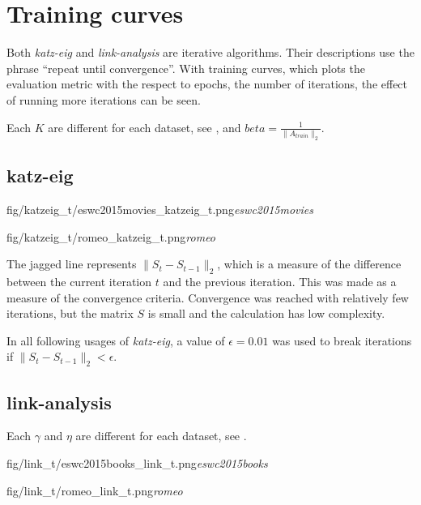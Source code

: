
\section{Training curves}\label{sec:graphs:training_curves}

Both \textit{katz-eig} and \textit{link-analysis} are iterative algorithms. Their descriptions use the phrase ``repeat until convergence''.  With training curves, which plots the evaluation metric with the respect to epochs, the number of iterations, the effect of running more iterations can be seen.

Each $K$ are different for each dataset, see , and $beta = \frac{1}{\|A_{train}\|_2}$.

\subsection{katz-eig}

\FloatBarrier

{fig/katzeig_t/eswc2015movies_katzeig_t.png}{\textit{eswc2015movies}}

{fig/katzeig_t/romeo_katzeig_t.png}{\textit{romeo}}

\FloatBarrier

The jagged line represents $\|S_t - S_{t - 1}\|_2$, which is a measure of the difference between the current iteration $t$ and the previous iteration. This was made as a measure of the convergence criteria. Convergence was reached with relatively few iterations, but the matrix $S$ is small and the calculation has low complexity.

In all following usages of \textit{katz-eig}, a value of $\epsilon = 0.01$ was used to break iterations if $\|S_t - S_{t - 1}\|_2 < \epsilon$.

\newpage


\subsection{link-analysis}

Each $\gamma$ and $\eta$ are different for each dataset, see .

{fig/link_t/eswc2015books_link_t.png}{\textit{eswc2015books}}

{fig/link_t/romeo_link_t.png}{\textit{romeo}}

